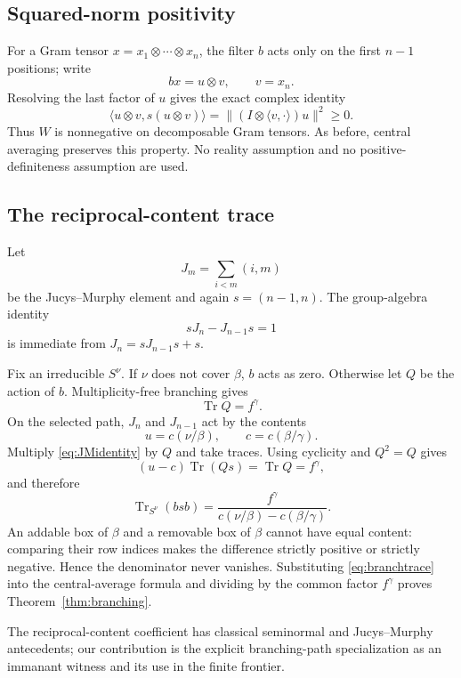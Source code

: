 \documentclass[11pt]{article}
\theoremstyle{definition}
\newcommand{\Tr}{\operatorname{Tr}}
\begin{document}
\subsection{Squared-norm positivity}
For a Gram tensor $x=x_1\otimes\cdots\otimes x_n$, the filter $b$ acts only on the first $n-1$ positions; write
\[
 bx=u\otimes v,
\qquad v=x_n.
\]
Resolving the last factor of $u$ gives the exact complex identity
\begin{equation}\label{eq:branchsq}
 \langle u\otimes v,s(u\otimes v)\rangle
 =\bigl\|(I\otimes\langle v,\cdot\rangle)u\bigr\|^2\ge0.
\end{equation}
Thus $W$ is nonnegative on decomposable Gram tensors.  As before, central averaging preserves this property.  No reality assumption and no positive-definiteness assumption are used.

\subsection{The reciprocal-content trace}
Let
\[
 J_m=\sum_{i<m}(i,m)
\]
be the Jucys--Murphy element and again $s=(n-1,n)$.  The group-algebra identity
\begin{equation}\label{eq:JMidentity}
 sJ_n-J_{n-1}s=1
\end{equation}
is immediate from $J_n=sJ_{n-1}s+s$.

Fix an irreducible $S^\nu$.  If $\nu$ does not cover $\beta$, $b$ acts as zero.  Otherwise let $Q$ be the action of $b$.  Multiplicity-free branching gives
\[
 \Tr Q=f^\gamma.
\]
On the selected path, $J_n$ and $J_{n-1}$ act by the contents
\[
 u=c(\nu/\beta),\qquad c=c(\beta/\gamma).
\]
Multiply \eqref{eq:JMidentity} by $Q$ and take traces.  Using cyclicity and $Q^2=Q$ gives
\[
 (u-c)\Tr(Qs)=\Tr Q=f^\gamma,
\]
and therefore
\begin{equation}\label{eq:branchtrace}
 \Tr_{S^\nu}(bsb)=\frac{f^\gamma}{c(\nu/\beta)-c(\beta/\gamma)}.
\end{equation}
An addable box of $\beta$ and a removable box of $\beta$ cannot have equal content: comparing their row indices makes the difference strictly positive or strictly negative.  Hence the denominator never vanishes.  Substituting \eqref{eq:branchtrace} into the central-average formula and dividing by the common factor $f^\gamma$ proves Theorem~\ref{thm:branching}.

The reciprocal-content coefficient has classical seminormal and Jucys--Murphy antecedents; our contribution is the explicit branching-path specialization as an immanant witness and its use in the finite frontier.
\end{document}
